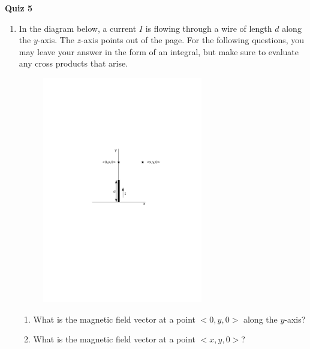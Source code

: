 \documentclass{article}
\begin{document}
\fancyfoot[C]{\thepage}
\vspace*{0cm}
\begin{center}
	{\LARGE \textbf{Quiz 5}}
\end{center}

\begin{enumerate}
	\item In the diagram below, a current $I$ is flowing through a wire of length $d$ along the $y$-axis. The $z$-axis points out of the page. For the following questions, you may leave your answer in the form of an integral, but make sure to evaluate any cross products that arise.
	\begin{figure}[ht!]
		\centering
		\includegraphics[width=7cm]{current_wire}
	\end{figure}
	\begin{enumerate}
		\item What is the magnetic field vector at a point $<0,y,0>$ along the $y$-axis?
		\vspace{5cm}
		\item What is the magnetic field vector at a point $<x,y,0>$?
	\end{enumerate}
\end{enumerate}
\end{document}

